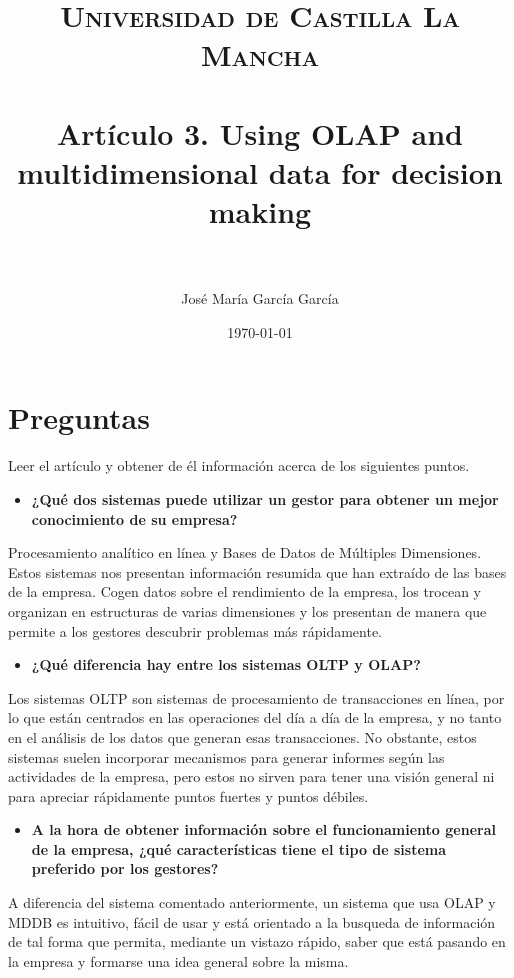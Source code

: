 \documentclass[paper=a4, fontsize=11pt]{scrartcl} %
\title{	
\normalfont \normalsize 
\textsc{Universidad de Castilla La Mancha} \\ [25pt] %
\horrule{0.5pt} \\[0.4cm] %
\huge Artículo 3. Using OLAP and multidimensional data for decision making \\ %
\horrule{2pt} \\[0.5cm] %
}
\author{José María García García} %
\date{\normalsize\today} %
\begin{document}
\maketitle %


\section{Preguntas}

Leer el artículo y obtener de él información acerca de los siguientes puntos.

\begin{itemize}
\item \textbf{ ¿Qué dos sistemas puede utilizar un gestor para obtener un mejor conocimiento de su empresa?}
\end{itemize}
Procesamiento analítico en línea y Bases de Datos de Múltiples Dimensiones. Estos sistemas nos presentan información resumida que han extraído de las bases de la empresa. Cogen datos sobre el rendimiento de la empresa, los trocean y organizan en estructuras de varias dimensiones y los presentan de manera que permite a los gestores descubrir problemas más rápidamente. 

\begin{itemize}
\item \textbf{¿Qué diferencia hay entre los sistemas OLTP y OLAP?}
\end{itemize}
Los sistemas OLTP son sistemas de procesamiento de transacciones en línea, por lo que están centrados en las operaciones del día a día de la empresa, y no tanto en el análisis de los datos que generan esas transacciones. No obstante, estos sistemas suelen incorporar mecanismos para generar informes según las actividades de la empresa, pero estos no sirven para tener una visión general ni para apreciar rápidamente puntos fuertes y puntos débiles. 

\begin{itemize}
\item \textbf{A la hora de obtener información sobre el funcionamiento general de la empresa, ¿qué características tiene el tipo de sistema preferido 	 por los gestores?}
\end{itemize}
A diferencia del sistema comentado anteriormente, un sistema que usa OLAP y MDDB es intuitivo, fácil de usar y está orientado a la busqueda de información de tal forma que permita, mediante un vistazo rápido, saber que está pasando en la empresa y formarse una idea general sobre la misma.
	
\end{document}
